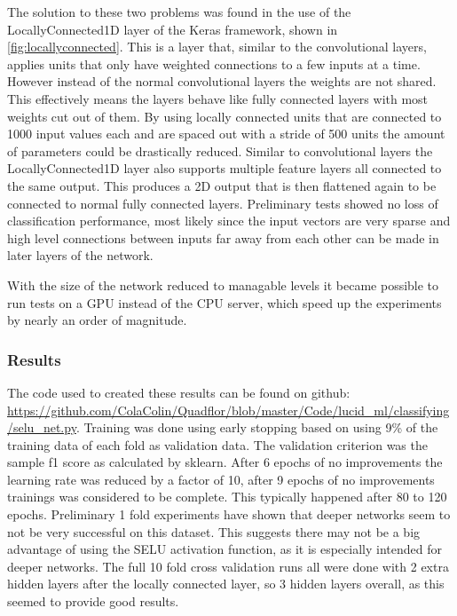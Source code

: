 \documentclass{article}
\begin{document}
The solution to these two problems was found in the use of the LocallyConnected1D layer of the Keras framework, shown in \ref{fig:locallyconnected}. This is a layer that, similar to the convolutional layers, applies 
units that only have weighted connections to a few inputs at a time. However instead of the normal convolutional layers the weights are not shared. This effectively means the layers behave like fully 
connected layers with most weights cut out of them. By using locally connected units that are connected to 1000 input values each and are spaced out with a stride of 500 units the amount of parameters
could be drastically reduced. Similar to convolutional layers the LocallyConnected1D layer also supports multiple feature layers all connected to the same output.
This produces a 2D output that is then flattened again to be connected to normal fully connected layers.
Preliminary tests showed no loss of classification performance, most likely since the input vectors are very sparse and high level connections between inputs far away from each other can be made 
in later layers of the network.

With the size of the network reduced to managable levels it became possible to run tests on a GPU instead of the CPU server, which speed up the experiments by nearly an order of magnitude.

\subsubsection*{Results}

The code used to created these results can be found on github: \url{https://github.com/ColaColin/Quadflor/blob/master/Code/lucid_ml/classifying/selu_net.py}.
Training was done using early stopping based on using 9\% of the training data of each fold as validation data. The validation criterion was the sample f1 score as calculated by sklearn.
After 6 epochs of no improvements the learning rate was reduced by a factor of 10, after 9 epochs of no improvements trainings was considered to be complete. This typically happened after 80 to 120 
epochs. Preliminary 1 fold experiments have shown that deeper networks seem to not be very successful on this dataset. This suggests there may not be a 
big advantage of using the SELU activation function, as it is especially intended for deeper networks. The full 10 fold cross validation runs all were done
with 2 extra hidden layers after the locally connected layer, so 3 hidden layers overall, as this seemed to provide good results.
\end{document}
